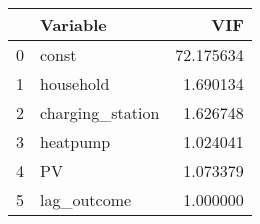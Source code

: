 \begin{tabular}{llr}
\toprule
 & Variable & VIF \\
\midrule
0 & const & 72.175634 \\
1 & household & 1.690134 \\
2 & charging_station & 1.626748 \\
3 & heatpump & 1.024041 \\
4 & PV & 1.073379 \\
5 & lag_outcome & 1.000000 \\
\bottomrule
\end{tabular}
